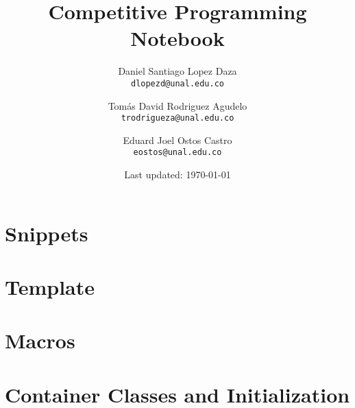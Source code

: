 \documentclass{article}
\title{Competitive Programming Notebook} %
\author{
 Daniel Santiago Lopez Daza\\
   \texttt{dlopezd@unal.edu.co}
  \and
  Tomás David Rodriguez Agudelo\\
  \texttt{trodrigueza@unal.edu.co}
  \and
  Eduard Joel Ostos Castro\\
    \texttt{eostos@unal.edu.co}  
}
\date{Last updated: \today}
\begin{document}
\maketitle
\newpage
\tableofcontents
\newpage
\section{Snippets}
\section{Template}
\section{Macros}
\section{Container Classes and Initialization}
\end{document}
